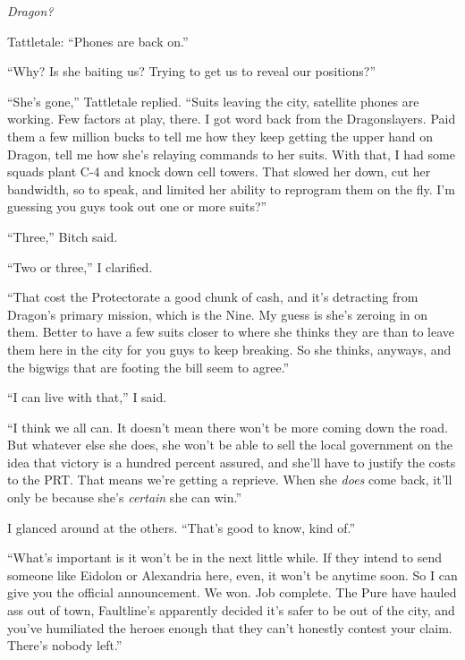 \emph{Dragon?  }



Tattletale: ``Phones are back on.''



``Why?  Is she baiting us?  Trying to get us to reveal our positions?''



``She's gone,'' Tattletale replied.  ``Suits leaving the city, satellite phones are working.  Few factors at play, there.  I got word back from the Dragonslayers.  Paid them a few million bucks to tell me how they keep getting the upper hand on Dragon, tell me how she's relaying commands to her suits.  With that, I had some squads plant C-4 and knock down cell towers.  That slowed her down, cut her bandwidth, so to speak, and limited her ability to reprogram them on the fly.  I'm guessing you guys took out one or more suits?''



``Three,'' Bitch said.



``Two or three,'' I clarified.



``That cost the Protectorate a good chunk of cash, and it's detracting from Dragon's primary mission, which is the Nine.  My guess is she's zeroing in on them.  Better to have a few suits closer to where she thinks they are than to leave them here in the city for you guys to keep breaking.  So she thinks, anyways, and the bigwigs that are footing the bill seem to agree.''



``I can live with that,'' I said.



``I think we all can.  It doesn't mean there won't be more coming down the road.  But whatever else she does, she won't be able to sell the local government on the idea that victory is a hundred percent assured, and she'll have to justify the costs to the PRT.  That means we're getting a reprieve.  When she \emph{does} come back, it'll only be because she's \emph{certain }she can win.''



I glanced around at the others.  ``That's good to know, kind of.''



``What's important is it won't be in the next little while.  If they intend to send someone like Eidolon or Alexandria here, even, it won't be anytime soon.  So I can give you the official announcement.  We won.  Job complete.  The Pure have hauled ass out of town, Faultline's apparently decided it's safer to be out of the city, and you've humiliated the heroes enough that they can't honestly contest your claim.  There's nobody left.''



